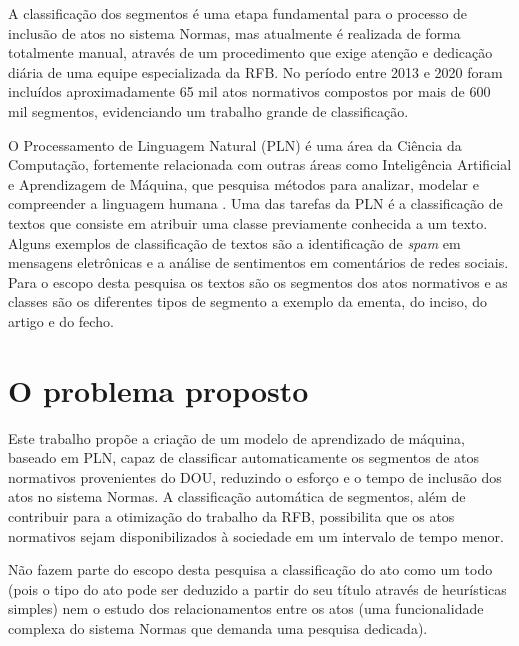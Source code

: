 A classificação dos segmentos é uma etapa fundamental para o processo de inclusão de atos no sistema Normas, mas atualmente é realizada de forma totalmente manual, através de um procedimento que exige atenção e dedicação diária de uma equipe especializada da RFB. No período entre 2013 e 2020 foram incluídos aproximadamente 65 mil atos normativos compostos por mais de 600 mil segmentos, evidenciando um trabalho grande de classificação.

O Processamento de Linguagem Natural (PLN) é uma área da Ciência da Computação, fortemente relacionada com outras áreas como Inteligência Artificial e Aprendizagem de Máquina, que pesquisa métodos para analizar, modelar e compreender a linguagem humana \cite{PracticalNLP2020}. Uma das tarefas da PLN é a classificação de textos que consiste em atribuir uma classe previamente conhecida a um texto. Alguns exemplos de classificação de textos são a identificação de \textit{spam} em mensagens eletrônicas e a análise de sentimentos em comentários de redes sociais. Para o escopo desta pesquisa os textos são os segmentos dos atos normativos e as classes são os diferentes tipos de segmento a exemplo da ementa, do inciso, do artigo e do fecho. 

\section{O problema proposto}

Este trabalho propõe a criação de um modelo de aprendizado de máquina, baseado em PLN, capaz de classificar automaticamente os segmentos de atos normativos provenientes do DOU, reduzindo o esforço e o tempo de inclusão dos atos no sistema Normas. A classificação automática de segmentos, além de contribuir para a otimização do trabalho da RFB, possibilita que os atos normativos sejam disponibilizados à sociedade em um intervalo de tempo menor.

Não fazem parte do escopo desta pesquisa a classificação do ato como um todo (pois o tipo do ato pode ser deduzido a partir do seu título através de heurísticas simples) nem o estudo dos relacionamentos entre os atos (uma funcionalidade complexa do sistema Normas que demanda uma pesquisa dedicada).   


